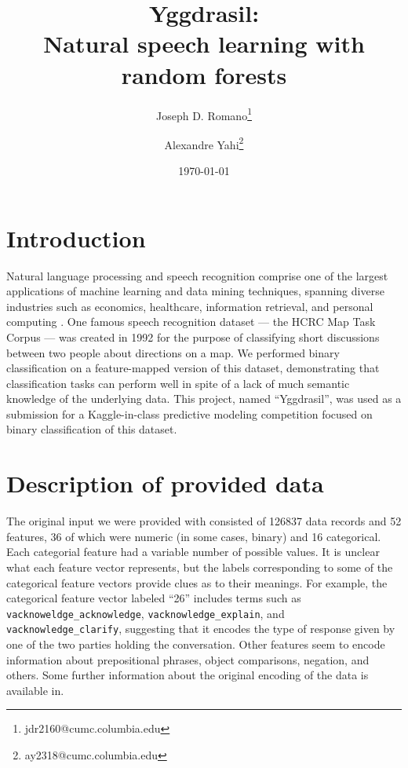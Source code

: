 \documentclass[11pt,a4paper]{article}
\begin{document}
\title{Yggdrasil:\\Natural speech learning with random forests}
\author[1]{Joseph D. Romano\thanks{jdr2160@cumc.columbia.edu}}
\author[1]{Alexandre Yahi\thanks{ay2318@cumc.columbia.edu}}
\renewcommand\Authands{ and }
\date{\today}
\maketitle


\section{Introduction}

Natural language processing and speech recognition comprise one of the largest applications of machine learning and data mining techniques, spanning diverse industries such as economics, healthcare, information retrieval, and personal computing \cite{Cambria:2014ck}. One famous speech recognition dataset --- the HCRC Map Task Corpus --- was created in 1992 for the purpose of classifying short discussions between two people about directions on a map\cite{Anderson:1991uh}. We performed binary classification on a feature-mapped version of this dataset, demonstrating that classification tasks can perform well in spite of a lack of much semantic knowledge of the underlying data. This project, named ``Yggdrasil'', was used as a submission for a Kaggle-in-class predictive modeling competition focused on binary classification of this dataset.

\section{Description of provided data}

The original input we were provided with consisted of 126837 data records and 52 features, 36 of which were numeric (in some cases, binary) and 16 categorical. Each categorial feature had a variable number of possible values. It is unclear what each feature vector represents, but the labels corresponding to some of the categorical feature vectors provide clues as to their meanings. For example, the categorical feature vector labeled ``26'' includes terms such as {\tt vacknoweldge\_acknowledge}, {\tt vacknowledge\_explain}, and {\tt vacknowledge\_clarify}, suggesting that it encodes the type of response given by one of the two parties holding the conversation. Other features seem to encode information about prepositional phrases, object comparisons, negation, and others. Some further information about the original encoding of the data is available in\cite{Anderson:1991uh}.
\end{document}
